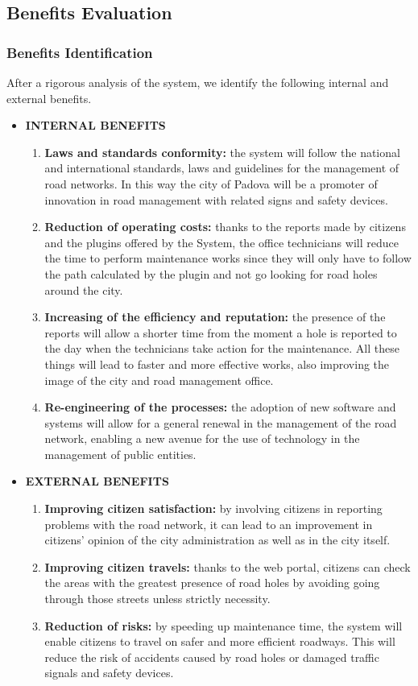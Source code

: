 \newpage

\subsection{Benefits Evaluation}
\subsubsection{Benefits Identification}
After a rigorous analysis of the system, we identify the following internal and external benefits.
\begin{itemize}
    \item \textbf{INTERNAL BENEFITS}
    \begin{enumerate}
        \item \textbf{Laws and standards conformity:} the system will follow the national and international standards, laws and guidelines for the management of road networks. In this way the city of Padova will be a promoter of innovation in road management with related signs and safety devices.
        \item \textbf{Reduction of operating costs:} thanks to the reports made by citizens and the plugins offered by the System, the office technicians will reduce the time to perform maintenance works since they will only have to follow the path calculated by the plugin and not go looking for road holes around the city.
        \item \textbf{Increasing of the efficiency and reputation:} the presence of the reports will allow a shorter time from the moment a hole is reported to the day when the technicians take action for the maintenance. All these things will lead to faster and more effective works, also improving the image of the city and road management office.
        \item \textbf{Re-engineering of the processes:} the adoption of new software and systems will allow for a general renewal in the management of the road network, enabling a new avenue for the use of technology in the management of public entities.
    \end{enumerate}
    \item \textbf{EXTERNAL BENEFITS}
    \begin{enumerate}
        \item \textbf{Improving citizen satisfaction:} by involving citizens in reporting problems with the road network, it can lead to an improvement in citizens' opinion of the city administration as well as in the city itself.
        \item \textbf{Improving citizen travels:} thanks to the web portal, citizens can check the areas with the greatest presence of road holes by avoiding going through those streets unless strictly necessity.
        \item \textbf{Reduction of risks:} by speeding up maintenance time, the system will enable citizens to travel on safer and more efficient roadways. This will reduce the risk of accidents caused by road holes or damaged traffic signals and safety devices.
    \end{enumerate}
\end{itemize}

